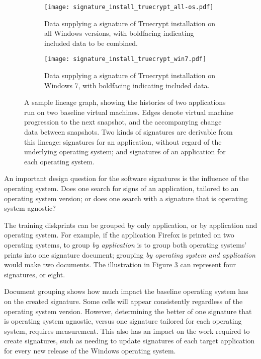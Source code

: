 \documentclass[11pt]{ucthesis}
\theoremstyle{plain}
\theoremstyle{definition}
\begin{document}
\begin{figure}
  \begin{center}
  \begin{small}
  \begin{subfigure}[b]{\textwidth}
    \texttt{[image: signature\_install\_truecrypt\_all-os.pdf]}
    \caption{Data supplying a signature of Truecrypt installation on all Windows versions, with boldfacing indicating included data to be combined.}
    \label{fig:osgrouping:app}
  \end{subfigure}

  \begin{subfigure}[b]{\textwidth}
    \texttt{[image: signature\_install\_truecrypt\_win7.pdf]}
    \caption{Data supplying a signature of Truecrypt installation on Windows 7, with boldfacing indicating included data.}
    \label{fig:osgrouping:osapp}
  \end{subfigure}
  \caption{\label{fig:osgrouping}A sample lineage graph, showing the histories of two applications run on two baseline virtual machines.  Edges denote virtual machine progression to the next snapshot, and the accompanying change data between snapshots.  Two kinds of signatures are derivable from this lineage: signatures for an application, without regard of the underlying operating system; and signatures of an application for each operating system.}
  \end{small}
  \end{center}
\end{figure}

An important design question for the software signatures is the influence of the operating system.  Does one search for signs of an application, tailored to an operating system version; or does one search with a signature that is operating system agnostic?

The training diskprints can be grouped by only application, or by application and operating system. For example, if the application Firefox is printed on two operating systems, to group \emph{by application} is to group both operating systems' prints into one signature document; grouping \emph{by operating system and application} would make two documents.  The illustration in Figure \ref{fig:osgrouping} can represent four signatures, or eight.

Document grouping shows how much impact the baseline operating system has on the created signature.  Some cells will appear consistently regardless of the operating system version.  However, determining the better of one signature that is operating system agnostic, versus one signature tailored for each operating system, requires measurement.  This also has an impact on the work required to create signatures, such as needing to update signatures of each target application for every new release of the Windows operating system.
\end{document}
